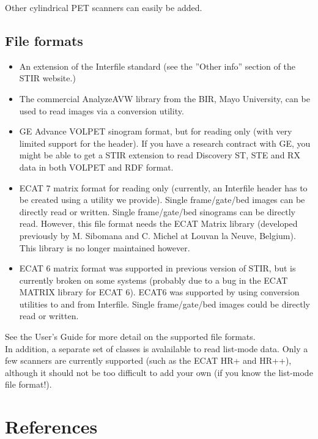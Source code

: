 \documentclass{article}
\begin{document}
Other cylindrical PET scanners can easily be added.


\subsection{
File formats}
\begin{itemize}
\item 
An extension of the Interfile standard (see the ''Other info'' section of the STIR website.)
\item 
The commercial AnalyzeAVW library from the BIR, Mayo University, can be used
to read images via a conversion utility.
\item 
GE Advance VOLPET sinogram format, but for reading only (with 
very limited support for the header). If you have a research contract with GE,
you might be able to get a STIR extension to read Discovery ST, STE and RX data in both 
VOLPET and RDF format.
\item 
ECAT 7 matrix format for reading only (currently, an Interfile 
header has to be created using a utility we provide). Single 
frame/gate/bed images can be directly read or written. Single 
frame/gate/bed sinograms can be directly read.
However, this file format needs the ECAT Matrix library (developed 
previously by M. Sibomana and C. Michel at Louvan la Neuve, Belgium).
This library is no longer maintained however.
\item 
ECAT 6 matrix format was supported in previous version of STIR, but
is currently broken on some systems (probably due to a bug in the ECAT 
MATRIX library for ECAT 6). ECAT6 was supported by using conversion 
utilities to and from 
Interfile. Single frame/gate/bed images could be directly read 
or written.
\end{itemize}

See the User's Guide for more detail on the supported file formats.\\
In addition, a separate set of classes is avalailable
to read list-mode 
data. Only a few scanners are currently supported (such as the 
ECAT HR+ and HR++), although it should not be too difficult to 
add your own (if you know the list-mode file format!). 



\section{
References}
\end{document}

